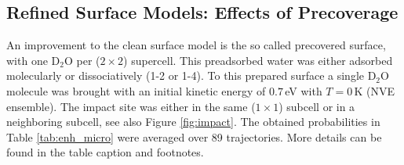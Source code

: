 \documentclass[11pt,DIV=13,BCOR=5mm,a4paper,headinclude]{scrbook}
\begin{document}
\subsection{Refined Surface Models: Effects of Precoverage}
An improvement to the clean surface model is the so called precovered surface, with one D$_2$O per ($2\times 2$) supercell.
This preadsorbed water was either adsorbed molecularly or dissociatively (1-2 or 1-4).
To this prepared surface a single D$_2$O molecule was brought with an initial kinetic energy of $0.7\,$eV with $T=0\,$K  (NVE ensemble).
The impact site was either in the same ($1\times 1$) subcell or in a neighboring subcell, see also Figure \ref{fig:impact}.
The obtained probabilities in Table \ref{tab:enh_micro} were averaged over 89 trajectories.
More details can be found in the table caption and footnotes.
\\
\end{document}
